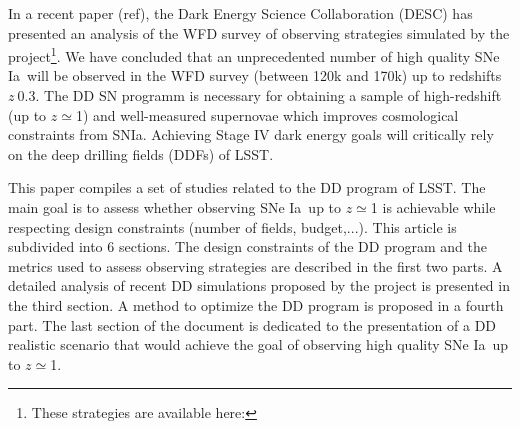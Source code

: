 \documentclass[\docopts]{\docclass}
\newcommand{\sne}{{SNe Ia}}
\begin{document}
\par
In a recent paper (ref), the Dark Energy Science Collaboration (DESC) has presented an analysis of the WFD survey of observing strategies simulated by the project\footnote{These strategies are available here: }. We have concluded that an unprecedented number of high quality \sne~will be observed in the WFD survey (between 120k and 170k) up to redshifts $z~$0.3. The DD SN programm is necessary for obtaining a sample of high-redshift (up to $z\simeq$1) and well-measured supernovae which improves cosmological constraints from SNIa. Achieving Stage IV dark energy goals will critically rely on the deep drilling fields (DDFs) of LSST.
\par
This paper compiles a set of studies related to the DD program of LSST. The main goal is to assess whether observing \sne~up to $z\simeq$1 is achievable while respecting design constraints (number of fields, budget,...). This article is subdivided into 6 sections. The design constraints of the DD program and the metrics used to assess observing strategies are described in the first two parts. A detailed analysis of recent DD simulations proposed by the project is presented in the third section. A method to optimize the DD program is proposed in a fourth part. The last section of the document is dedicated to the presentation of a DD realistic scenario that would achieve the goal of observing high quality \sne~up to  $z\simeq$1.
\end{document}
